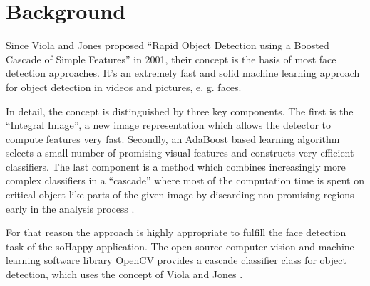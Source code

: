 \section{Background} \label{sec:background}
Since Viola and Jones proposed ``Rapid Object Detection using a Boosted Cascade of Simple Features'' in 2001, their concept is the basis of most face detection approaches.
It's an extremely fast and solid machine learning approach for object detection in videos and pictures, e. g. faces.

In detail, the concept is distinguished by three key components.
The first is the “Integral Image”, a new image representation which allows the detector to compute features very fast.
Secondly, an AdaBoost based learning algorithm selects a small number of promising visual features and constructs very efficient classifiers.
The last component is a method which combines increasingly more complex classifiers in a “cascade” where most of the computation time is spent on critical object-like parts of the given image by discarding non-promising regions early in the analysis process \cite{viola_jones}.

For that reason the approach is highly appropriate to fulfill the face detection task of the soHappy application.
The open source computer vision and machine learning software library OpenCV provides a cascade classifier class for object detection, which uses the concept of Viola and Jones \cite{opencv_cascade_classifier}.


